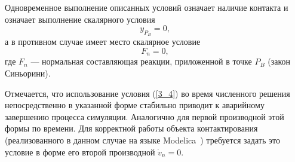 


Одновременное выполнение описанных условий означает наличие
контакта и означает выполнение скалярного условия 
\begin{equation}
y_{P_B}=0,
\label{3_4}
\end{equation}
а в противном случае имеет место скалярное условие
$$
F_n=0,
$$
где $F_n$ --- нормальная составляющая реакции, приложенной в точке $P_B$ (закон Синьорини).


Отмечается, что использование условия (\ref{3_4}) во время численного решения
непосредственно в указанной форме стабильно приводит к аварийному завершению процесса симуляции.
Аналогично для первой производной этой формы по времени.
Для корректной работы объекта контактирования
(реализованного в данном случае на языке Modelica~\cite{Fritzson})
требуется задать это условие в форме его второй производной $\dot{v}_n=0$.


